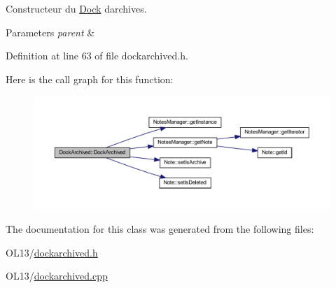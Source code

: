 Constructeur du \hyperlink{class_dock}{Dock} d\textquotesingle{}archives. 


\begin{DoxyParams}{Parameters}
{\em parent} & \\
\hline
\end{DoxyParams}


Definition at line 63 of file dockarchived.\+h.

Here is the call graph for this function\+:\nopagebreak
\begin{figure}[H]
\begin{center}
\leavevmode
\includegraphics[width=350pt]{class_dock_archived_ad3cc1b3cbaa84fed8d37c478927c7463_cgraph}
\end{center}
\end{figure}


The documentation for this class was generated from the following files\+:\begin{DoxyCompactItemize}
\item 
O\+L13/\hyperlink{dockarchived_8h}{dockarchived.\+h}\item 
O\+L13/\hyperlink{dockarchived_8cpp}{dockarchived.\+cpp}\end{DoxyCompactItemize}

